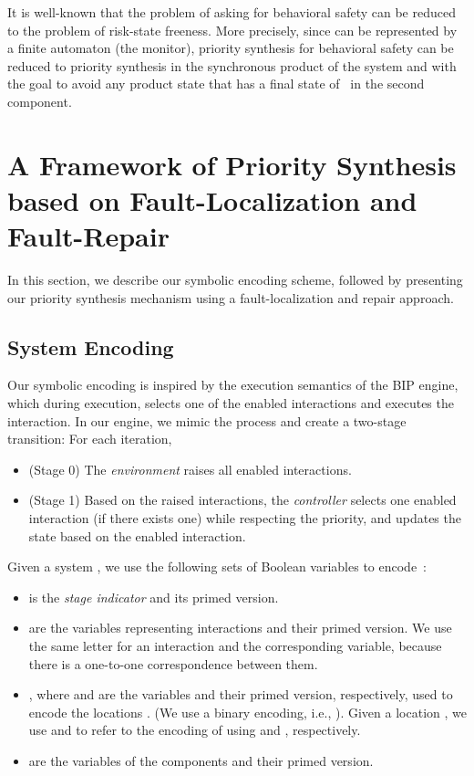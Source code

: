 \documentclass[10pt, a4paper, onecolumn, conference, compsocconf]{IEEEtran}
\begin{document}
It is well-known that the problem of asking for behavioral safety can be reduced to the problem of risk-state freeness.
More precisely, since  can be represented by a finite automaton  (the monitor), priority synthesis for behavioral safety can be reduced to priority synthesis in the synchronous product of the system  and  with the goal to avoid any product state that has a final state of~ in the second component.


\section{A Framework of Priority Synthesis based on Fault-Localization and Fault-Repair\label{sec.algo.prioritysyn.repair}}


In this section, we describe our symbolic encoding scheme, followed by presenting our priority synthesis mechanism
using a fault-localization and repair approach.

\subsection{System Encoding\label{subsec.algo.prioritysyn.encoding}}

\newcommand{\enc}{enc}


Our symbolic encoding is inspired by the execution semantics of the BIP engine, which
during execution, selects one of the enabled interactions and executes the interaction.
In our engine, we mimic the process and create a two-stage transition: For each iteration,

\begin{itemize}
    \item (Stage 0) The \emph{environment} raises all enabled interactions.
    \item (Stage 1) Based on the raised interactions, the \emph{controller} selects one enabled interaction (if there exists one) while respecting the priority, and updates the state based on the enabled interaction.
\end{itemize}


Given a system , we use the
following sets of Boolean variables to encode~:
\begin{itemize}
    \item  is the \emph{stage indicator} and its primed
      version.
    \item  are the
      variables representing interactions and their primed version.
      We use the same letter for an interaction and the
      corresponding variable, because there is a one-to-one
      correspondence between them.
\item , where
       and  are the variables and their primed version,
      respectively, used to encode the locations . (We use a
      binary encoding, i.e., ). Given a
      location , we use  and  to refer
      to the encoding of  using  and
      , respectively.
   \item  are the
     variables of the components and their primed version.
\end{itemize}
\end{document}
